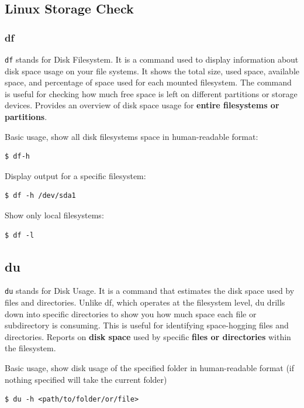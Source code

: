 \documentclass{article}
\newenvironment{codetemplate}[1][]{%
  \mybasecolorbox[#1]
  \itshape
}{%
  \endmybasecolorbox
}
\begin{document}
\subsection{Linux Storage Check}
\subsubsection{df}
\verb|df| stands for Disk Filesystem. It is a command used to display information about disk space usage on your file systems. It shows the total size, used space, available space, and percentage of space used for each mounted filesystem. The command is useful for checking how much free space is left on different partitions or storage devices.
Provides an overview of disk space usage for \textbf{entire filesystems or partitions}.

Basic usage, show all disk filesystems space in human-readable format:
\begin{codetemplate}{}
\begin{verbatim}
$ df-h
\end{verbatim}
\end{codetemplate}

Display output for a specific filesystem:
\begin{codetemplate}{}
\begin{verbatim}
$ df -h /dev/sda1
\end{verbatim}
\end{codetemplate}

Show only local filesystems:
\begin{codetemplate}{}
\begin{verbatim}
$ df -l
\end{verbatim}
\end{codetemplate}

\subsection{du}
\verb|du| stands for Disk Usage. It is a command that estimates the disk space used by files and directories. Unlike df, which operates at the filesystem level, du drills down into specific directories to show you how much space each file or subdirectory is consuming. This is useful for identifying space-hogging files and directories.
Reports on \textbf{disk space} used by specific \textbf{files or directories} within the filesystem.

Basic usage, show disk usage of the specified folder in human-readable format (if nothing specified will take the current folder)
\begin{codetemplate}{}
\begin{verbatim}
$ du -h <path/to/folder/or/file>
\end{verbatim}
\end{codetemplate}
\end{document}
